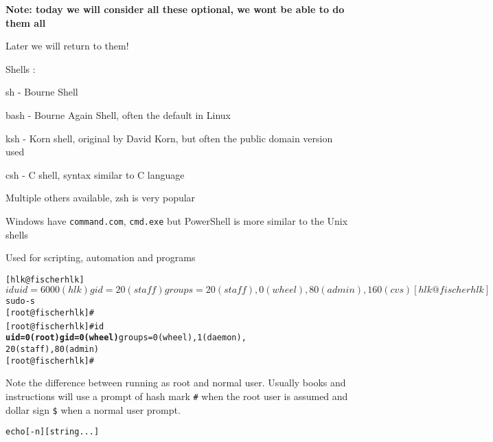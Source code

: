 \documentclass[Screen16to9,17pt]{foils}
\begin{document}
{\bf Note: today we will consider all these optional, we wont be able to do them all}

Later we will return to them!


\begin{list1}
\item Shells :
  \begin{list2}
    \item sh - Bourne Shell
\item bash - Bourne Again Shell, often the default in Linux
\item ksh - Korn shell, original by David Korn, but often the public domain version used
\item csh - C shell, syntax similar to C language
\item Multiple others available, zsh is very popular
  \end{list2}
\item Windows have \verb+command.com+, \verb+cmd.exe+ but PowerShell is more similar to the Unix shells
\item Used for scripting, automation and programs
\end{list1}





\begin{alltt}
\small
[hlk@fischer hlk]$ id
uid=6000(hlk) gid=20(staff) groups=20(staff),
0(wheel), 80(admin), 160(cvs)
[hlk@fischer hlk]$ sudo -s
[root@fischer hlk]#
[root@fischer hlk]# id {\bf
uid=0(root) gid=0(wheel)} groups=0(wheel), 1(daemon),
20(staff), 80(admin)
[root@fischer hlk]#
\end{alltt}

Note the difference between running as root and normal user. Usually books and instructions will use a prompt of hash mark \verb+#+ when the root user is assumed and dollar sign \verb+$+ when a normal user prompt.



\begin{alltt}
echo [-n] [string ...]
\end{alltt}
\end{document}
